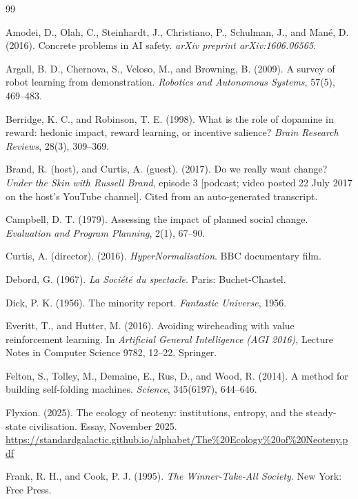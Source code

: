 \documentclass[11pt]{article}
\theoremstyle{definition}
\theoremstyle{remark}
\begin{document}
\begin{thebibliography}{99}

Amodei, D., Olah, C., Steinhardt, J., Christiano, P., Schulman, J., and Man\'e, D. (2016). Concrete problems in AI safety. \emph{arXiv preprint arXiv:1606.06565}.

Argall, B. D., Chernova, S., Veloso, M., and Browning, B. (2009). A survey of robot learning from demonstration. \emph{Robotics and Autonomous Systems}, 57(5), 469--483.

Berridge, K. C., and Robinson, T. E. (1998). What is the role of dopamine in reward: hedonic impact, reward learning, or incentive salience? \emph{Brain Research Reviews}, 28(3), 309--369.

Brand, R. (host), and Curtis, A. (guest). (2017). Do we really want change? \emph{Under the Skin with Russell Brand}, episode 3 [podcast; video posted 22 July 2017 on the host's YouTube channel]. Cited from an auto-generated transcript.

Campbell, D. T. (1979). Assessing the impact of planned social change. \emph{Evaluation and Program Planning}, 2(1), 67--90.

Curtis, A. (director). (2016). \emph{HyperNormalisation}. BBC documentary film.

Debord, G. (1967). \emph{La Soci\'et\'e du spectacle}. Paris: Buchet-Chastel.

Dick, P. K. (1956). The minority report. \emph{Fantastic Universe}, 1956.

Everitt, T., and Hutter, M. (2016). Avoiding wireheading with value reinforcement learning. In \emph{Artificial General Intelligence (AGI 2016)}, Lecture Notes in Computer Science 9782, 12--22. Springer.

Felton, S., Tolley, M., Demaine, E., Rus, D., and Wood, R. (2014). A method for building self-folding machines. \emph{Science}, 345(6197), 644--646.

Flyxion. (2025). The ecology of neoteny: institutions, entropy, and the steady-state civilisation. Essay, November 2025. \url{https://standardgalactic.github.io/alphabet/The\%20Ecology\%20of\%20Neoteny.pdf}

Frank, R. H., and Cook, P. J. (1995). \emph{The Winner-Take-All Society}. New York: Free Press.


\end{thebibliography}
\end{document}
